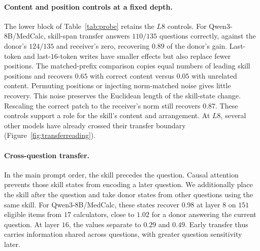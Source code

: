 \paragraph{Content and position controls at a fixed depth.}
The lower block of Table~\ref{tab:probe} retains the $L8$ controls.
For Qwen3-8B/MedCalc, skill-span transfer answers $110/135$ questions
correctly, against the donor's $124/135$ and receiver's zero, recovering
$0.89$ of the donor's gain. Last-token and last-$16$-token writes have
smaller effects but also replace fewer positions. The matched-prefix
comparison copies equal numbers of leading skill positions and recovers
$0.65$ with correct content versus $0.05$ with unrelated content.
Permuting positions or injecting norm-matched noise gives little recovery.
This noise preserves the Euclidean length of the skill-state change.
Rescaling the correct patch to the receiver's norm still recovers $0.87$.
These controls support a role for the skill's content and arrangement.
At $L8$, several other models have already crossed their transfer boundary
(Figure~\ref{fig:transferreading}).

\paragraph{Cross-question transfer.}
\label{sec:whose}
In the main prompt order, the skill precedes the question. Causal attention
prevents those skill states from encoding a later question. We additionally
place the skill after the question and take donor states from other
questions using the same skill. For Qwen3-8B/MedCalc, these states recover
$0.98$ at layer $8$ on $151$ eligible items from $17$ calculators, close to $1.02$ for
a donor answering the current question. At layer $16$, the values separate
to $0.29$ and $0.49$. Early transfer thus carries information shared across
questions, with greater question sensitivity later.

